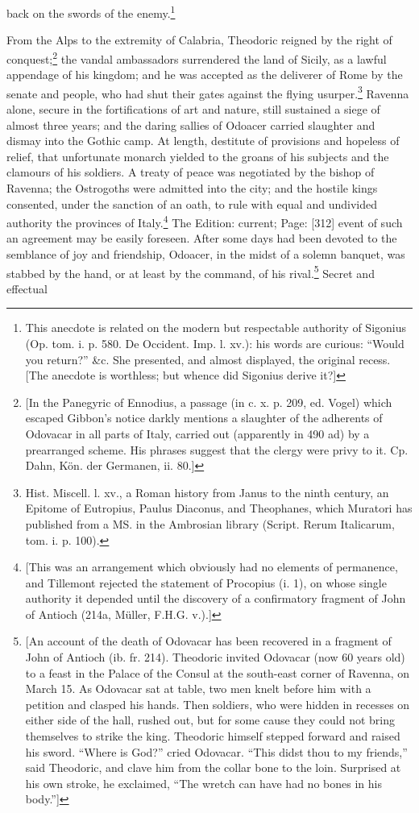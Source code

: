back on the swords of the enemy.\footnote{This anecdote is related on the modern but respectable authority of Sigonius (Op. tom. i. p. 580. De Occident. Imp. l. xv.): his words are curious: \texthebrew{“}Would you return?\texthebrew{}” \&c. She presented, and almost displayed, the original recess. [The anecdote is worthless; but whence did Sigonius derive it?]}

From the Alps to the extremity of Calabria, Theodoric reigned by the right of conquest;\footnote{[In the Panegyric of Ennodius, a passage (in c. x. p. 209, ed. Vogel) which escaped Gibbon\texthebrew{}’s notice darkly mentions a slaughter of the adherents of Odovacar in all parts of Italy, carried out (apparently in 490 ad) by a prearranged scheme. His phrases suggest that the clergy were privy to it. Cp. Dahn, Kön. der Germanen, ii. 80.]} the vandal ambassadors surrendered the land of Sicily, as a lawful appendage of his kingdom; and he was accepted as the deliverer of Rome by the senate and people, who had shut their gates against the flying usurper.\footnote{Hist. Miscell. l. xv., a Roman history from Janus to the ninth century, an Epitome of Eutropius, Paulus Diaconus, and Theophanes, which Muratori has published from a MS. in the Ambrosian library (Script. Rerum Italicarum, tom. i. p. 100).} Ravenna alone, secure in the fortifications of art and nature, still sustained a siege of almost three years; and the daring sallies of Odoacer carried slaughter and dismay into the Gothic camp. At length, destitute of provisions and hopeless of relief, that unfortunate monarch yielded to the groans of his subjects and the clamours of his soldiers. A treaty of peace was negotiated by the bishop of Ravenna; the Ostrogoths were admitted into the city; and the hostile kings consented, under the sanction of an oath, to rule with equal and undivided authority the provinces of Italy.\footnote{[This was an arrangement which obviously had no elements of permanence, and Tillemont rejected the statement of Procopius (i. 1), on whose single authority it depended until the discovery of a confirmatory fragment of John of Antioch (214a, Müller, F.H.G. v.).]} The Edition: current; Page: [312] event of such an agreement may be easily foreseen. After some days had been devoted to the semblance of joy and friendship, Odoacer, in the midst of a solemn banquet, was stabbed by the hand, or at least by the command, of his rival.\footnote{[An account of the death of Odovacar has been recovered in a fragment of John of Antioch (ib. fr. 214). Theodoric invited Odovacar (now 60 years old) to a feast in the Palace of the Consul at the south-east corner of Ravenna, on March 15. As Odovacar sat at table, two men knelt before him with a petition and clasped his hands. Then soldiers, who were hidden in recesses on either side of the hall, rushed out, but for some cause they could not bring themselves to strike the king. Theodoric himself stepped forward and raised his sword. \texthebrew{“}Where is God?\texthebrew{}” cried Odovacar. \texthebrew{“}This didst thou to my friends,\texthebrew{}” said Theodoric, and clave him from the collar bone to the loin. Surprised at his own stroke, he exclaimed, \texthebrew{“}The wretch can have had no bones in his body.\texthebrew{}”]} Secret and effectual 